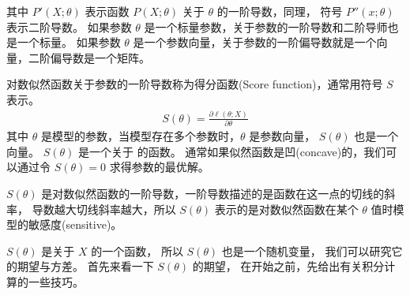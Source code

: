 \documentclass[letterpaper,10pt,english]{sphinxmanual}
\begin{document}
其中 \(P'(X;\theta)\) 表示函数 \(P(X;\theta)\)
关于 \(\theta\) 的一阶导数，同理，
符号 \(P''(x;\theta)\) 表示二阶导数。
如果参数 \(\theta\) 是一个标量参数，关于参数的一阶导数和二阶导师也是一个标量。
如果参数 \(\theta\) 是一个参数向量，关于参数的一阶偏导数就是一个向量，二阶偏导数是一个矩阵。

\begin{sphinxShadowBox}

对数似然函数关于参数的一阶导数称为得分函数(Score function)，通常用符号 \(S\) 表示。
\begin{equation}\label{equation:推断与检验/content:推断与检验/content:56}
\begin{split}S(\theta)= \frac{\partial \ell(\theta;X)}{\partial \theta}\end{split}
\end{equation}
其中 \(\theta\) 是模型的参数，当模型存在多个参数时，\(\theta\) 是参数向量，
\(S(\theta)\) 也是一个向量。 \(S(\theta)\) 是一个关于  的函数。
通常如果似然函数是凹(concave)的，我们可以通过令 \(S(\theta)=0\) 求得参数的最优解。
\end{sphinxShadowBox}

\(S(\theta)\) 是对数似然函数的一阶导数，一阶导数描述的是函数在这一点的切线的斜率，
导数越大切线斜率越大，所以 \(S(\theta)\) 表示的是对数似然函数在某个 \(\theta\)
值时模型的敏感度(sensitive)。

\(S(\theta)\) 是关于 \(X\) 的一个函数，
所以 \(S(\theta)\) 也是一个随机变量，
我们可以研究它的期望与方差。
首先来看一下 \(S(\theta)\)  的期望，
在开始之前，先给出有关积分计算的一些技巧。
\end{document}
